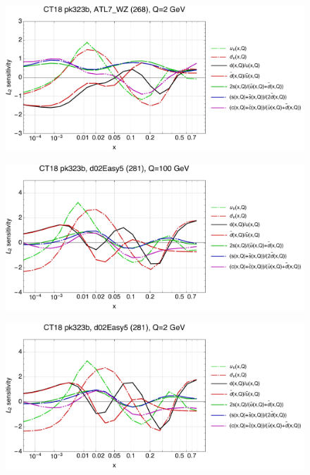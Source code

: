 \documentclass[10pt,aps,prd,floatfix,titlepage]{revtex4}
\begin{document}
\begin{figure}
\includegraphics[width=\textwidth,height=0.44\textheight,keepaspectratio]{2/268_ct18nn_q2_Sf_2.pdf}
\caption{}
\end{figure}
\clearpage
\begin{figure}
\includegraphics[width=\textwidth,height=0.44\textheight,keepaspectratio]{2/281_ct18nn_q100_Sf_2.pdf}
\caption{}
\end{figure}
\begin{figure}
\includegraphics[width=\textwidth,height=0.44\textheight,keepaspectratio]{2/281_ct18nn_q2_Sf_2.pdf}
\caption{}
\end{figure}
\end{document}
